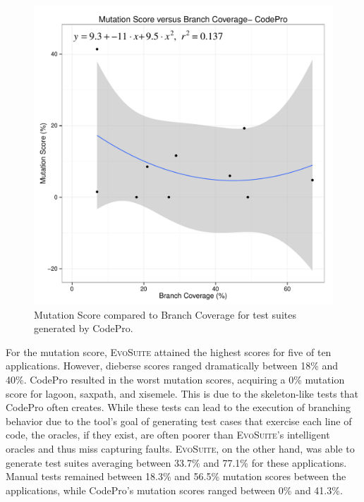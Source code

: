 \begin{figure}[!t]
\centering
  \includegraphics[width=\linewidth]{RGraphs/CodePro_BranchCov_versus_Mutation_poly.pdf}
    \caption{Mutation Score compared to Branch Coverage for test suites generated by CodePro.}
  \label{fig:CP_branch_mutation}
\end{figure}
For the mutation score, \textsc{EvoSuite} attained the highest scores for five of ten applications. However, dieberse scores ranged dramatically between 18\% and 40\%.  CodePro resulted in the worst mutation scores, acquiring a  0\% mutation score for lagoon, saxpath, and xisemele. This is due to the skeleton-like tests that CodePro often creates.  While these tests can lead to the execution of branching behavior due to the tool's goal of generating test cases that exercise each line of code, the oracles, if they exist, are often poorer than \textsc{EvoSuite}'s intelligent oracles and thus miss capturing faults. \textsc{EvoSuite}, on the other hand, was able to generate test suites averaging between 33.7\% and 77.1\% for these applications. Manual tests remained between 18.3\% and 56.5\%  mutation scores between the applications, while CodePro's mutation scores ranged between 0\% and 41.3\%. 


